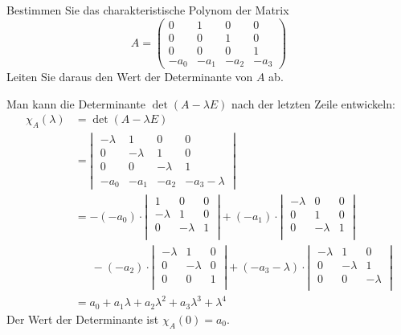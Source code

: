 Bestimmen Sie das charakteristische Polynom der Matrix
\[
A=\begin{pmatrix}
       0&       1&       0&       0\\
       0&       0&       1&       0\\
       0&       0&       0&       1\\
-a_0    &-a_1    &-a_2    &-a_3
\end{pmatrix}
\]
Leiten Sie daraus den Wert der Determinante von $A$ ab.


\begin{loesung}
Man kann die Determinante $\det(A-\lambda E)$ nach der letzten Zeile
entwickeln:
\begin{align*}
\chi_A(\lambda)&=\det(A-\lambda E)\\
&=\left|\;\begin{matrix}
-\lambda&       1&       0&       0\\
       0&-\lambda&       1&       0\\
       0&       0&-\lambda&       1\\
-a_0    &-a_1    &-a_2    &-a_3-\lambda
\end{matrix}\;\right|
\\
&=
-(-a_0)\cdot
\left|\;\begin{matrix}
       1&       0&       0\\
-\lambda&       1&       0\\
       0&-\lambda&       1\\
\end{matrix}\;\right|
+(-a_1)\cdot
\left|\;\begin{matrix}
-\lambda&       0&       0\\
       0&       1&       0\\
       0&-\lambda&       1\\
\end{matrix}\;\right|
\\
&\phantom{=}\,
-(-a_2)\cdot
\left|\;\begin{matrix}
-\lambda&       1&       0\\
       0&-\lambda&       0\\
       0&       0&       1\\
\end{matrix}\;\right|
+(-a_3-\lambda)\cdot
\left|\;\begin{matrix}
-\lambda&       1&       0\\
       0&-\lambda&       1\\
       0&       0&-\lambda\\
\end{matrix}\;\right|
\\
&=a_0+a_1\lambda+a_2\lambda^2+a_3\lambda^3+\lambda^4
\end{align*}
Der Wert der Determinante ist $\chi_A(0)=a_0$.
\end{loesung}

